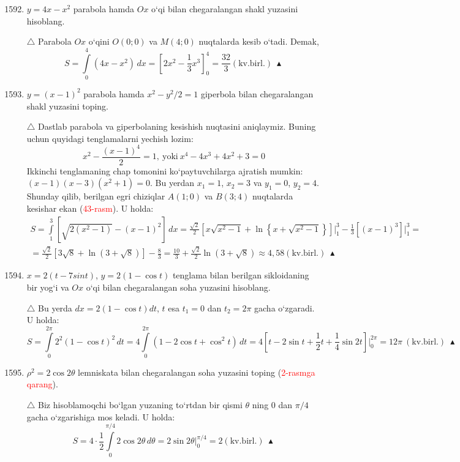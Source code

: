 \begin{enumerate}\setcounter{enumi}{1591}
	
	\item $y=4x-x^2$ parabola hamda $Ox$ o`qi bilan chegaralangan shakl yuzasini hisoblang.
	
	$\triangle$ Parabola $Ox$ o`qini $O(0;0)$ va $M(4;0)$ nuqtalarda kesib o`tadi. Demak,
	$$S=\int\limits_0^4(4x-x^2)\,dx=\left[2x^2-\frac{1}{3}x^3\right]_0^4=\frac{32}{3}(\textrm{kv.birl.})\ \blacktriangle$$
	
	\item $y=(x-1)^2$ parabola hamda $x^2-y^2/2=1$ giperbola bilan chegaralangan shakl yuzasini toping.
	
	$\triangle$ Dastlab parabola va giperbolaning kesishish nuqtasini aniqlaymiz. Buning uchun quyidagi tenglamalarni yechish lozim:
	$$x^2-\frac{(x-1)^4}{2}=1,\ \mbox{yoki}\ x^4-4x^3+4x^2+3=0$$
	Ikkinchi tenglamaning chap tomonini ko`paytuvchilarga ajratish mumkin: $(x-1)(x-3)(x^2+1)=0$. Bu yerdan $x_1=1$, $x_2=3$ va $y_1=0$, $y_2=4$. Shunday qilib, berilgan egri chiziqlar $A(1;0)$ va $B(3;4)$ nuqtalarda kesishar ekan (\textcolor{red}{43-rasm}). U holda:
	\begin{multline*}
		S=\int\limits_1^3\left[\sqrt{2(x^2-1)}-(x-1)^2\right]\,dx=\frac{\sqrt{2}}{2}\left[x\sqrt{x^2-1}+\ln\left\{ x+\sqrt{x^2-1}\right\}\right]\bigg|_{1}^{3}-\frac{1}{3}\left[(x-1)^3\right]\bigg|_{1}^{3}=\\
		=\frac{\sqrt{2}}{2}\left[3\sqrt{8}+\ln\left(3+\sqrt{8}\right)\right]-\frac{8}{3}=\frac{10}{3}+\frac{\sqrt{2}}{2}\ln\left(3+\sqrt{8}\right)\approx4,58(\mbox{kv.birl.})\ \blacktriangle
	\end{multline*}
	
	
	\item $x=2(t-7sin t)$, $y=2(1-\cos t)$ tenglama bilan berilgan sikloidaning bir yog`i va $Ox$ o`qi bilan chegaralangan soha yuzasini hisoblang.
	
	$\triangle$ Bu yerda $dx=2(1-\cos t)dt$, $t$ esa $t_1=0$ dan $t_2=2\pi$ gacha o`zgaradi. U holda:
	$$S=\int\limits_0^{2\pi}2^2(1-\cos t)^2\, dt=4\int\limits_0^{2\pi}(1-2\cos t+\cos^2 t)\, dt=4\left[t-2\sin t+\frac{1}{2}t+\frac{1}{4}\sin 2t\right]\bigg|_{0}^{2\pi}=12\pi\ (\mbox{kv.birl.})\ \blacktriangle$$
	
	
	
	\item $\rho^2=2\cos 2\theta$ lemniskata bilan chegaralangan soha yuzasini toping (\textcolor{red}{2-rasmga qarang}).
	
	$\triangle$ Biz hisoblamoqchi bo`lgan yuzaning to`rtdan bir qismi $\theta$ ning $0$ dan $\pi/4$ gacha o`zgarishiga mos keladi. U holda:
	$$S=4\cdot\frac{1}{2}\int\limits_{0}^{\pi/4}2\cos 2\theta\, d\theta=2\sin 2\theta\bigg|_{0}^{\pi/4}=2 (\mbox{kv.birl.})\ \blacktriangle$$
	
	
	
\end{enumerate}


